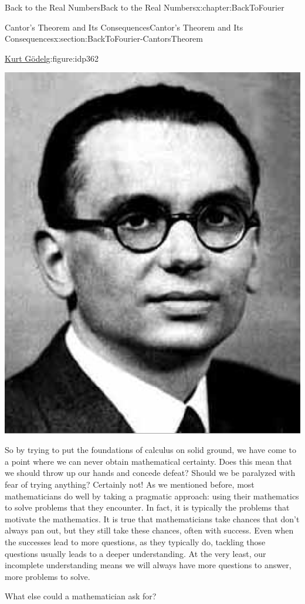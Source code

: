 \begin{chapterptx}{Back to the Real Numbers}{}{Back to the Real Numbers}{}{}{x:chapter:BackToFourier}
\begin{sectionptx}{Cantor's Theorem and Its Consequences}{}{Cantor's Theorem and Its Consequences}{}{}{x:section:BackToFourier-CantorsTheorem}
\begin{figureptx}{\href{https://mathshistory.st-andrews.ac.uk/Biographies/Godel/}{Kurt Gödel}\protect\footnotemark{}}{g:figure:idp362}{}
\begin{image}{0.325}{0.35}{0.325}
				\includegraphics[width=\linewidth]{external/images/Godel.png}
			\end{image}%
			\tcblower
		\end{figureptx}%
		So by trying to put the foundations of calculus on solid ground, we have come to a point where we can never obtain mathematical certainty. Does this mean that we should throw up our hands and concede defeat? Should we be paralyzed with fear of trying anything? Certainly not! As we mentioned before, most mathematicians do well by taking a pragmatic approach: using their mathematics to solve problems that they encounter. In fact, it is typically the problems that motivate the mathematics. It is true that mathematicians take chances that don't always pan out, but they still take these chances, often with success. Even when the successes lead to more questions, as they typically do, tackling those questions usually leads to a deeper understanding. At the very least, our incomplete understanding means we will always have more questions to answer, more problems to solve.%
		\par
		What else could a mathematician ask for?%
	\end{sectionptx}
\end{chapterptx}
%
%